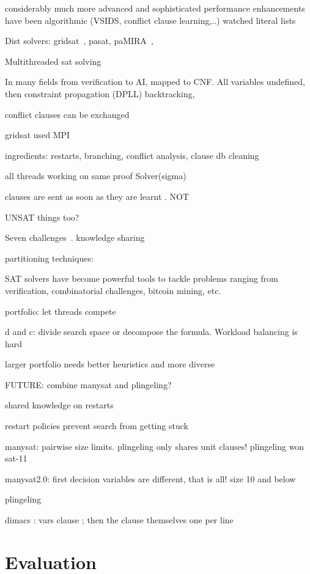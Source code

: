\documentclass{article}
\begin{document}
considerably much more advanced and sophisticated
performance enhancements have been algorithmic (VSIDS, conflict clause learning,..) 
watched literal lists 

Dist solvers: gridsat~\cite{chrabakh2003gridsat}, pasat, paMIRA~\cite{schubert2005pamira}, 

Multithreaded sat solving~\cite{lewis2007multithreaded}

In many fields from verification to AI, mapped to CNF. All variables
undefined, then constraint propagation (DPLL) backtracking,

conflict clauses can be exchanged

gridsat used MPI 

ingredients: restarts, branching, conflict analysis, clause db cleaning

all threads working on same proof Solver(sigma) 

clauses are sent as soon as they are learnt . NOT 

UNSAT things too? 

Seven challenges~\cite{hamadi2013seven}. knowledge sharing

partitioning techniques: ~\cite{hyvarinen2010partitioning}

SAT solvers have become powerful tools to tackle problems ranging from
verification, combinatorial challenges, bitcoin mining, etc.

portfolio: let threads compete 

d and c: divide search space or decompose the formula. Workload balancing is hard 

larger portfolio needs better heuristics and more diverse 

FUTURE: combine manysat and plingeling?

shared knowledge on restarts 

restart policies prevent search from getting stuck 

manysat: pairwise size limits. plingeling only shares unit clauses! plingeling won sat-11

manysat2.0: first decision variables are different, that is all! size 10 and below 

plingeling ~\cite{biere2010lingeling}

dimacs : vars clause ; then the clause themselves one per line 






\section{Evaluation}
\end{document}
